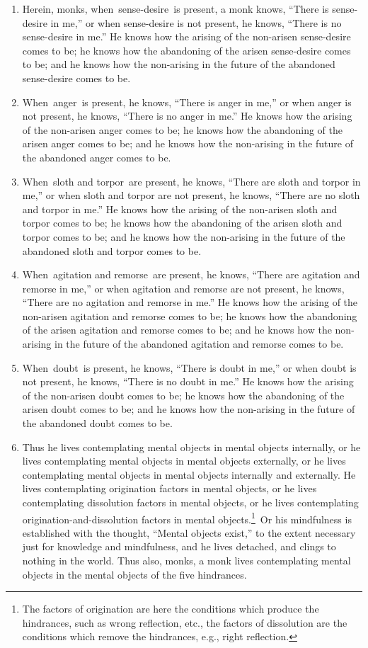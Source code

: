 \begin{enumerate}[resume]
\item Herein, monks, when sense-desire is present, a monk knows, “There is sense-desire in me,” or when sense-desire is not present, he knows, “There is no sense-desire in me.” He knows how the arising of the non-arisen sense-desire comes to be; he knows how the abandoning of the arisen sense-desire comes to be; and he knows how the non-arising in the future of the abandoned sense-desire comes to be.
\item When anger is present, he knows, “There is anger in me,” or when anger is not present, he knows, “There is no anger in me.” He knows how the arising of the non-arisen anger comes to be; he knows how the abandoning of the arisen anger comes to be; and he knows how the non-arising in the future of the abandoned anger comes to be.
\item When sloth and torpor are present, he knows, “There are sloth and torpor in me,” or when sloth and torpor are not present, he knows, “There are no sloth and torpor in me.” He knows how the arising of the non-arisen sloth and torpor comes to be; he knows how the abandoning of the arisen sloth and torpor comes to be; and he knows how the non-arising in the future of the abandoned sloth and torpor comes to be.
\item When agitation and remorse are present, he knows, “There are agitation and remorse in me,” or when agitation and remorse are not present, he knows, “There are no agitation and remorse in me.” He knows how the arising of the non-arisen agitation and remorse comes to be; he knows how the abandoning of the arisen agitation and remorse comes to be; and he knows how the non-arising in the future of the abandoned agitation and remorse comes to be.
\item When doubt is present, he knows, “There is doubt in me,” or when doubt is not present, he knows, “There is no doubt in me.” He knows how the arising of the non-arisen doubt comes to be; he knows how the abandoning of the arisen doubt comes to be; and he knows how the non-arising in the future of the abandoned doubt comes to be.
\item Thus he lives contemplating mental objects in mental objects internally, or he lives contemplating mental objects in mental objects externally, or he lives contemplating mental objects in mental objects internally and externally. He lives contemplating origination factors in mental objects, or he lives contemplating dissolution factors in mental objects, or he lives contemplating origination-and-dissolution factors in mental objects.\footnote{The factors of origination are here the conditions which produce the hindrances, such as wrong reflection, etc., the factors of dissolution are the conditions which remove the hindrances, e.g., right reflection.} Or his mindfulness is established with the thought, “Mental objects exist,” to the extent necessary just for knowledge and mindfulness, and he lives detached, and clings to nothing in the world. Thus also, monks, a monk lives contemplating mental objects in the mental objects of the five hindrances.
\end{enumerate}
